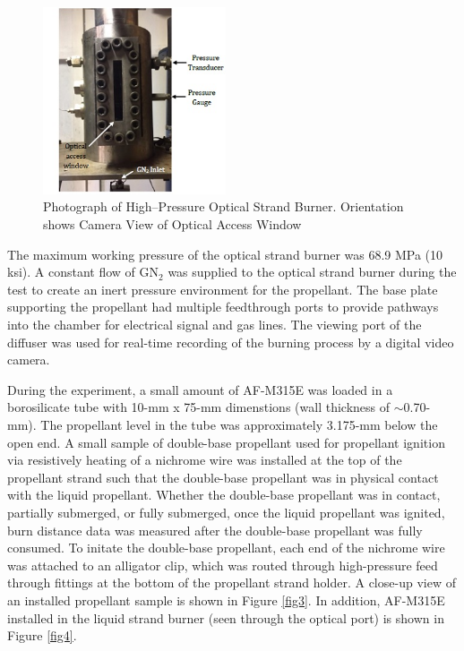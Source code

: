 \documentclass{article}
\begin{document}
\begin{figure}[htb]
\centering
\includegraphics[width=0.48\textwidth]{Figure_2.jpg}
\caption{Photograph of High--Pressure Optical Strand Burner. Orientation shows Camera View of Optical Access Window}
\label{fig2}
\end{figure}

The maximum working pressure of the optical strand burner was 68.9 MPa (10 ksi). A constant flow of GN$_2$ was
supplied to the optical strand burner during the test to create an inert pressure environment for the propellant.
The base plate supporting the propellant had multiple feedthrough ports to provide pathways into the chamber for
electrical signal and gas lines. The viewing port of the diffuser was used for real-time recording of the burning
process by a digital video camera.

During the experiment, a small amount of AF-M315E was loaded in a borosilicate tube with 10-mm x 75-mm dimenstions
(wall thickness of $\sim$0.70-mm). The propellant level in the tube was approximately 3.175-mm below the open end.
A small sample of double-base propellant used for propellant ignition via resistively heating of a nichrome wire
was installed at the top of the propellant strand such that the double-base propellant was in physical contact with
the liquid propellant. Whether the double-base propellant was in contact, partially submerged, or fully submerged,
once the liquid propellant was ignited, burn distance data was measured after the double-base propellant was fully
consumed. To initate the double-base propellant, each end of the nichrome wire was attached to an alligator clip, 
which was routed through high-pressure feed through fittings at the bottom of the propellant strand holder. A
close-up view of an installed propellant sample is shown in Figure \ref{fig3}. In addition, AF-M315E installed in
the liquid strand burner (seen through the optical port) is shown in Figure \ref{fig4}.
\end{document}
